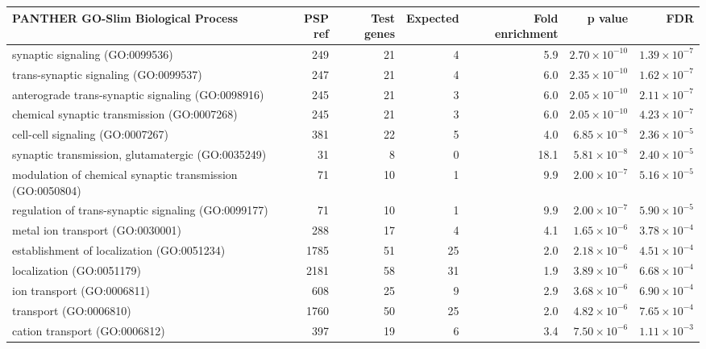 \begin{table}[ht]
\centering
\begin{adjustbox}{width=\textwidth}

\begin{tabular}{lrrrrrr}
  \hline
PANTHER GO-Slim Biological Process & PSP ref & Test genes & Expected & Fold enrichment & p value & FDR \\ 
  \hline
synaptic signaling (GO:0099536) & 249 & 21 & 4 & 5.9 & $2.70 \times 10^{-10}$ & $1.39 \times 10^{-7}$ \\ 
  trans-synaptic signaling (GO:0099537) & 247 & 21 & 4 & 6.0 & $2.35 \times 10^{-10}$ & $1.62 \times 10^{-7}$ \\ 
  anterograde trans-synaptic signaling (GO:0098916) & 245 & 21 & 3 & 6.0 & $2.05 \times 10^{-10}$ & $2.11 \times 10^{-7}$ \\ 
  chemical synaptic transmission (GO:0007268) & 245 & 21 & 3 & 6.0 & $2.05 \times 10^{-10}$ & $4.23 \times 10^{-7}$ \\ 
  cell-cell signaling (GO:0007267) & 381 & 22 & 5 & 4.0 & $6.85 \times 10^{-8}$ & $2.36 \times 10^{-5}$ \\ 
  synaptic transmission, glutamatergic (GO:0035249) & 31 & 8 & 0 & 18.1 & $5.81 \times 10^{-8}$ & $2.40 \times 10^{-5}$ \\ 
  modulation of chemical synaptic transmission (GO:0050804) & 71 & 10 & 1 & 9.9 & $2.00 \times 10^{-7}$ & $5.16 \times 10^{-5}$ \\ 
  regulation of trans-synaptic signaling (GO:0099177) & 71 & 10 & 1 & 9.9 & $2.00 \times 10^{-7}$ & $5.90 \times 10^{-5}$ \\ 
  metal ion transport (GO:0030001) & 288 & 17 & 4 & 4.1 & $1.65 \times 10^{-6}$ & $3.78 \times 10^{-4}$ \\ 
  establishment of localization (GO:0051234) & 1785 & 51 & 25 & 2.0 & $2.18 \times 10^{-6}$ & $4.51 \times 10^{-4}$ \\ 
  localization (GO:0051179) & 2181 & 58 & 31 & 1.9 & $3.89 \times 10^{-6}$ & $6.68 \times 10^{-4}$ \\ 
  ion transport (GO:0006811) & 608 & 25 & 9 & 2.9 & $3.68 \times 10^{-6}$ & $6.90 \times 10^{-4}$ \\ 
  transport (GO:0006810) & 1760 & 50 & 25 & 2.0 & $4.82 \times 10^{-6}$ & $7.65 \times 10^{-4}$ \\ 
  cation transport (GO:0006812) & 397 & 19 & 6 & 3.4 & $7.50 \times 10^{-6}$ & $1.11 \times 10^{-3}$ \\ 

\end{tabular}
\end{adjustbox}
\end{table}

